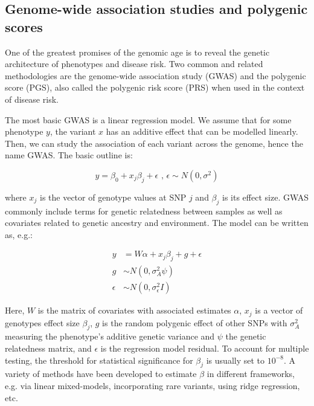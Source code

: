 \subsection{Genome-wide association studies and polygenic scores}

One of the greatest promises of the genomic age is to reveal the genetic architecture of phenotypes and disease risk. Two common and related methodologies are the genome-wide association study (GWAS) and the polygenic score (PGS), also called the polygenic risk score (PRS) when used in the context of disease risk.

The most basic GWAS is a linear regression model. We assume that for some phenotype $y$, the variant $x$ has an additive effect that can be modelled linearly. Then, we can study the association of each variant across the genome, hence the name GWAS. The basic outline is:

$$ y = \beta_0 + x_{j}\beta_{j} + \epsilon \text{ , } \epsilon \sim N(0,\sigma^{2})  $$

where $x_{j}$ is the vector of genotype values at SNP $j$ and $\beta_{j}$ is its effect size. GWAS commonly include terms for genetic relatedness between samples as well as covariates related to genetic ancestry and environment. The model can be written as, e.g.\citep{uffelmann_genome-wide_2021}:

\begin{spacing}{1}
\begin{align*} 
y & = W\alpha + x_{j}\beta_{j} + g + \epsilon \\
g & \sim N(0,\sigma^{2}_{A}\psi) \\
\epsilon & \sim N(0,\sigma^{2}_{\epsilon}I)
\end{align*} 
\end{spacing}

Here, $W$ is the matrix of covariates with associated estimates $\alpha$, $x_{j}$ is a vector of genotypes effect size $\beta_{j}$, $g$ is the random polygenic effect of other SNPs with $\sigma^{2}_{A}$ measuring the phenotype's additive genetic variance and $\psi$ the genetic relatedness matrix, and $\epsilon$ is the regression model residual. To account for multiple testing, the threshold for statistical significance for $\beta_{j}$ is usually set to $10^{-8}$. A variety of methods have been developed to estimate $\beta$ in different frameworks, e.g. via linear mixed-models\citep{loh_mixed-model_2018}, incorporating rare variants\citep{zhou_saige-gene_2022}, using ridge regression\citep{mbatchou_computationally_2021}, etc.

